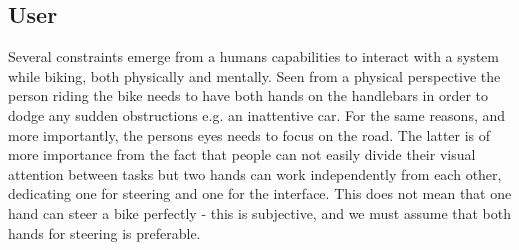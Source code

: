 





\subsection{User}
Several constraints emerge from a humans capabilities to interact with a system while biking, both physically and mentally. Seen from a physical perspective the person riding the bike needs to have both hands on the handlebars in order to dodge any sudden obstructions e.g. an inattentive car. For the same reasons, and more importantly, the persons eyes needs to focus on the road. The latter is of more importance from the fact that people can not easily divide their visual attention between tasks \cite{brewster_overcoming_2002} but two hands can work independently from each other, dedicating one for steering and one for the interface. This does not mean that one hand can steer a bike perfectly - this is subjective, and we must assume that both hands for steering is preferable.

